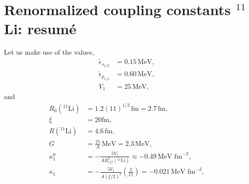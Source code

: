  \section{Renormalized coupling constants $^{11}$Li: resum\'e}\label{C2SF2}
 Let us make use of the values,
 \begin{align}
 \nonumber \tilde\epsilon_{s_{1/2}}&=0.15\, \text{MeV},\\
\nonumber  \tilde\epsilon_{p_{1/2}}&=0.60\, \text{MeV},\\
  V_1&=25\, \text{MeV},
 \end{align}
and 
  \begin{align}
R_0(^{11}\text{Li})&=1.2 (11)^{1/3}\,\text{fm}=2.7\,\text{fm},\\
\xi&=20\text{fm},\\
R(^{11}\text{Li})&=4.6\,\text{fm},\\
G&=\frac{25}{A}\,\text{MeV}=2.3\,\text{MeV},\\
\kappa_1^0&=-\frac{5V_1}{A R_{eff}^2(^{11}\text{Li})}\approx -0.49\,\text{MeV fm}^{-2},\\
\kappa_1&=-\frac{5V_1}{A \left(\xi/2\right)^2}\left(\frac{2}{11}\right)= -0.021\,\text{MeV fm}^{-2},
  \end{align}

 
 
